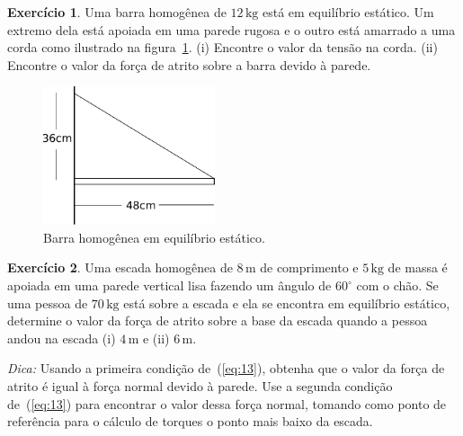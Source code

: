 \documentclass[papersize=a4,DIV=calc,twocolumn=on]{scrartcl}
\theoremstyle{definition}
\newtheorem{ex}{Exercício}[section]
\begin{document}
\begin{ex}
  Uma barra homogênea de $12\,\mathrm{kg}$ está em equilíbrio
  estático. Um extremo dela está apoiada em uma parede rugosa e o
  outro está amarrado a uma corda como ilustrado na
  figura~\ref{fig:barra_equilibrio}. (i) Encontre o valor da tensão na
  corda. (ii) Encontre o valor da força de atrito sobre a barra devido
  à parede.
  \begin{figure}[ht]
    \centering
    \includegraphics[width=0.45\textwidth,keepaspectratio]{barra_equilibrio.pdf}
    \caption{Barra homogênea em equilíbrio estático.}
    \label{fig:barra_equilibrio}
  \end{figure}
\end{ex}

\begin{ex}
  Uma escada homogênea de $8\,\mathrm{m}$ de comprimento e
  $5\,\mathrm{kg}$ de massa é apoiada em uma parede vertical lisa
  fazendo um ângulo de $60^\circ$ com o chão. Se uma pessoa de
  $70\,\mathrm{kg}$ está sobre a escada e ela se encontra em
  equilíbrio estático, determine o valor da força de atrito sobre a
  base da escada quando a pessoa andou na escada (i) $4\,\mathrm{m}$ e
  (ii) $6\,\mathrm{m}$.

  \noindent\textit{Dica:} Usando a primeira condição de~(\ref{eq:13}), obtenha
  que o valor da força de atrito é igual à força normal devido à
  parede. Use a segunda condição de~(\ref{eq:13}) para encontrar o
  valor dessa força normal, tomando como ponto de referência para o
  cálculo de torques o ponto mais baixo da escada.
\end{ex}
\end{document}
